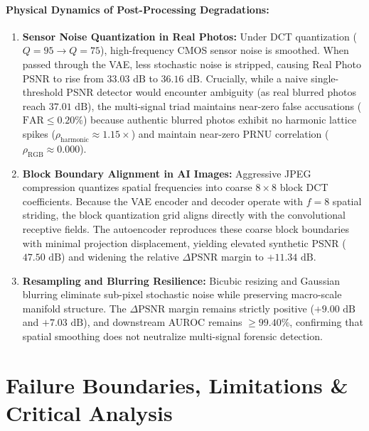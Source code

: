 \documentclass[11pt]{article}
\theoremstyle{definition}
\begin{document}
\paragraph{Physical Dynamics of Post-Processing Degradations:}
\begin{enumerate}
    \item \textbf{Sensor Noise Quantization in Real Photos:} Under DCT quantization ($Q=95 \to Q=75$), high-frequency CMOS sensor noise is smoothed. When passed through the VAE, less stochastic noise is stripped, causing Real Photo PSNR to rise from $33.03\text{ dB}$ to $36.16\text{ dB}$. Crucially, while a naive single-threshold PSNR detector would encounter ambiguity (as real blurred photos reach $37.01\text{ dB}$), the multi-signal triad maintains near-zero false accusations ($\text{FAR} \le 0.20\%$) because authentic blurred photos exhibit no harmonic lattice spikes ($\rho_{\text{harmonic}} \approx 1.15\times$) and maintain near-zero PRNU correlation ($\rho_{\text{RGB}} \approx 0.000$).
    \item \textbf{Block Boundary Alignment in AI Images:} Aggressive JPEG compression quantizes spatial frequencies into coarse $8\times 8$ block DCT coefficients. Because the VAE encoder and decoder operate with $f=8$ spatial striding, the block quantization grid aligns directly with the convolutional receptive fields. The autoencoder reproduces these coarse block boundaries with minimal projection displacement, yielding elevated synthetic PSNR ($47.50\text{ dB}$) and widening the relative $\Delta\text{PSNR}$ margin to $+11.34\text{ dB}$.
    \item \textbf{Resampling and Blurring Resilience:} Bicubic resizing and Gaussian blurring eliminate sub-pixel stochastic noise while preserving macro-scale manifold structure. The $\Delta\text{PSNR}$ margin remains strictly positive ($+9.00\text{ dB}$ and $+7.03\text{ dB}$), and downstream AUROC remains $\ge 99.40\%$, confirming that spatial smoothing does not neutralize multi-signal forensic detection.
\end{enumerate}

\section{Failure Boundaries, Limitations \& Critical Analysis}
\label{sec:limitations}
\end{document}
